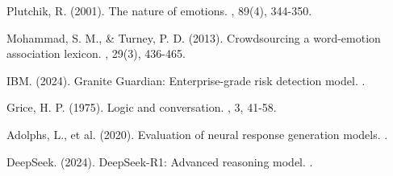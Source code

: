 \documentclass[12pt]{article}
\begin{document}
\begin{thebibliography}{9}
Plutchik, R. (2001).
\newblock The nature of emotions.
, 89(4), 344-350.

Mohammad, S. M., \& Turney, P. D. (2013).
\newblock Crowdsourcing a word-emotion association lexicon.
, 29(3), 436-465.

IBM. (2024).
\newblock Granite Guardian: Enterprise-grade risk detection model.
.

Grice, H. P. (1975).
\newblock Logic and conversation.
, 3, 41-58.

Adolphs, L., et al. (2020).
\newblock Evaluation of neural response generation models.
.

DeepSeek. (2024).
\newblock DeepSeek-R1: Advanced reasoning model.
.
\end{thebibliography}
\end{document}
